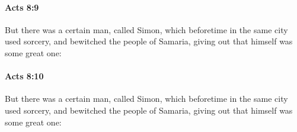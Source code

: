		\paragraph{Acts 8:9} %
			\label{ACTS-8-9}

			But there was a certain man, called Simon, which beforetime in the same city used sorcery, and bewitched the people of Samaria, giving out that himself was some great one:

			\begin{framed}
			\scriptsize
				\begin{compactdesc}
					\item[SBLG] 
				\end{compactdesc}
			\end{framed}

		\paragraph{Acts 8:10} %
			\label{ACTS-8-10}

			But there was a certain man, called Simon, which beforetime in the same city used sorcery, and bewitched the people of Samaria, giving out that himself was some great one:


